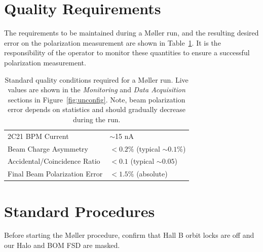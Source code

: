 \documentclass[amsmath,amssymb,notitlepage,12pt]{revtex4}
\begin{document}
\section{Quality Requirements}\label{sec:quality}
The requirements to be maintained during a M{\o}ller run, and the resulting desired error on the polarization measurement are shown in Table~\ref{tab:reqs}.  It is the responsibility of the operator to monitor these quantities to ensure a successful polarization measurement.
\begin{table}[htbp]\centering
    \begin{tabular}{ll}\toprule[1.5pt]
        2C21 BPM Current & $\sim$15 nA\\
        Beam Charge Asymmetry & $<0.2\%$ (typical $\sim 0.1\%$)\\
        Accidental/Coincidence Ratio & $<0.1$ (typical $\sim 0.05$)\\
        Final Beam Polarization Error & $<1.5\%$ (absolute)\\
        \bottomrule[1.5pt]
    \end{tabular}
    \caption{Standard quality conditions required for a M{\o}ller run.  Live values are shown in the {\em Monitoring} and {\em Data Acquisition} sections in Figure~\ref{fig:unconfig}.  Note, beam polarization error depends on statistics and should gradually decrease during the run.\label{tab:reqs}}
\end{table}

\newpage

\section{Standard Procedures}\label{sec:user}
Before starting the M{\o}ller procedure, confirm that Hall B orbit locks are off and our Halo and BOM FSD are masked.
\end{document}
